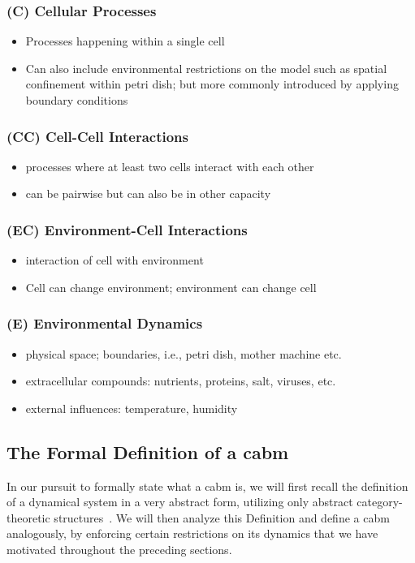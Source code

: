 \subsubsection{(C) Cellular Processes}
\begin{itemize}
    \item Processes happening within a single cell
    \item Can also include environmental restrictions on the model such as spatial confinement
        within petri dish; but more commonly introduced by applying boundary conditions
\end{itemize}

\subsubsection{(CC) Cell-Cell Interactions}
\begin{itemize}
    \item processes where at least two cells interact with each other
    \item can be pairwise but can also be in other capacity
\end{itemize}

\subsubsection{(EC) Environment-Cell Interactions}
\begin{itemize}
    \item interaction of cell with environment
    \item Cell can change environment; environment can change cell
\end{itemize}

\subsubsection{(E) Environmental Dynamics}
\begin{itemize}
    \item physical space; boundaries, i.e., petri dish, mother machine etc.
    \item extracellular compounds: nutrients, proteins, salt, viruses, etc.
    \item external influences: temperature, humidity
\end{itemize}

\subsection{The Formal Definition of a \acl{cabm}}
In our pursuit to formally state what a \ac{cabm} is, we will first recall the definition of a
dynamical system in a very abstract form, utilizing only abstract category-theoretic
structures~\cite{MacLane1978}.
We will then analyze this Definition and define a \ac{cabm} analogously, by enforcing certain
restrictions on its dynamics that we have motivated throughout the preceding sections.

